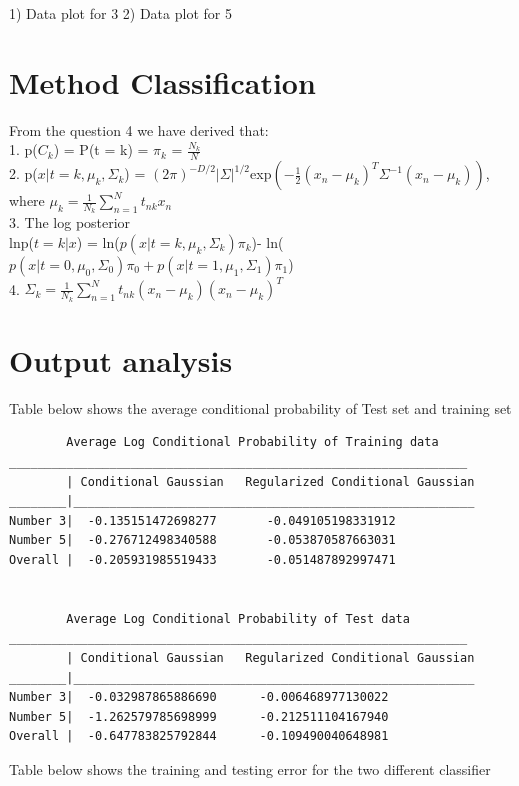 \documentclass[12pt]{article}
\begin{document}
\hspace{1in} 1) Data plot for 3    \hspace{2in} 2) Data plot for 5


\cleardoublepage 

\section{Method Classification}

From the question 4 we have derived that:\\

1. p($C_k$) = P(t = k) = $\pi_k$ = $\frac{N_k}{N}$\\

2. p($x|t = k,\mu_k,\Sigma_k$) = $(2\pi)^{-D/2}|\Sigma|^{1/2}$exp$(-\frac{1}{2}(x_n-\mu_k)^T\Sigma^{-1}(x_n-\mu_k))$, \\ where $\mu_k = \frac{1}{N_k}\sum\limits_{n=1}^N t_{nk}x_n$\\

3. The log posterior \\
lnp($t= k|x$) = ln($p(x|t=k,\mu_k,\Sigma_k)\pi_k$)- ln($p(x|t=0,\mu_0,\Sigma_0)\pi_0+p(x|t=1,\mu_1,\Sigma_1)\pi_1$)
\\

4. $\Sigma_k = \frac{1}{N_k} \sum\limits_{n=1}^N t_{nk}(x_n-\mu_k)(x_n-\mu_k)^T$\\

\section{Output analysis}
Table below shows the average conditional probability of Test set and training set\\

\begin{verbatim}
		Average Log Conditional Probability of Training data
________________________________________________________________
        | Conditional Gaussian   Regularized Conditional Gaussian
________|________________________________________________________
Number 3|  -0.135151472698277       -0.049105198331912
Number 5|  -0.276712498340588       -0.053870587663031
Overall |  -0.205931985519433       -0.051487892997471


		Average Log Conditional Probability of Test data
________________________________________________________________
        | Conditional Gaussian   Regularized Conditional Gaussian
________|________________________________________________________ 
Number 3|  -0.032987865886690      -0.006468977130022
Number 5|  -1.262579785698999      -0.212511104167940
Overall |  -0.647783825792844      -0.109490040648981

\end{verbatim}
 \cleardoublepage
  Table below shows the training and testing error for the two different classifier \\
\end{document}
